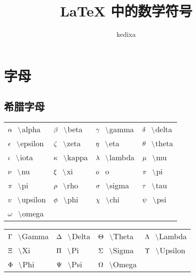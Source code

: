 \documentclass{ctexart}
\newcommand{\sihao}{\fontsize{14pt}{\baselineskip}\selectfont}
\newcommand{\pair}[2]{${#1} \hspace{0.3cm} \backslash ${#2}}
\newcommand{\nbpair}[2]{${#1} \hspace{0.3cm} ${#2}} %
\begin{document}
\title{LaTeX 中的数学符号}
\author{kedixa}
\maketitle
\section{字母}
\subsection{希腊字母}
\sihao
\begin{tabular}{p{3cm}p{3cm}p{3cm}p{3cm}}
    \pair{\alpha}{alpha} & \pair{\beta}{beta} & \pair{\gamma}{gamma} & \pair{\delta}{delta} \\
    \pair{\epsilon}{epsilon} & \pair{\zeta}{zeta} & \pair{\eta}{eta} & \pair{\theta}{theta} \\
    \pair{\iota}{iota} & \pair{\kappa}{kappa} & \pair{\lambda}{lambda} & \pair{\mu}{mu} \\
    \pair{\nu}{nu} & \pair{\xi}{xi} & \nbpair{o}{o} & \pair{\pi}{pi} \\
    \pair{\pi}{pi} & \pair{\rho}{rho} & \pair{\sigma}{sigma} & \pair{\tau}{tau} \\
    \pair{\upsilon}{upsilon} & \pair{\phi}{phi} & \pair{\chi}{chi} & \pair{\psi}{psi} \\
    \pair{\omega}{omega} & & &\\
\end{tabular}

\vspace{0.5cm}
\begin{tabular}{p{3cm}p{3cm}p{3cm}p{3cm}}
    \pair{\Gamma}{Gamma} & \pair{\Delta}{Delta} & \pair{\Theta}{Theta} & \pair{\Lambda}{Lambda} \\
    \pair{\Xi}{Xi} & \pair{\Pi}{Pi} & \pair{\Sigma}{Sigma} & \pair{\Upsilon}{Upsilon} \\
    \pair{\Phi}{Phi} & \pair{\Psi}{Psi} & \pair{\Omega}{Omega} &\\
\end{tabular}
\end{document}

